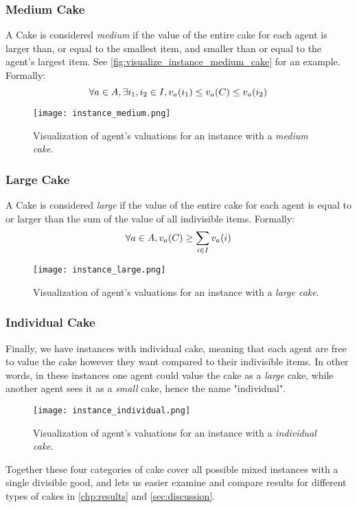 \subsubsection*{Medium Cake}\label{subsubsec:medium-cake}
A Cake is considered \textit{medium} if the value of the entire cake for each agent is larger than, or equal to the smallest item, and smaller than or equal to the agent's largest item. See \autoref{fig:visualize_instance_medium_cake} for an example. Formally:
$$\forall a\in A, \exists i_1,i_2\in I, v_a(i_1)\leq v_a(C)\leq v_a(i_2)$$
\begin{figure}
    \centering
    \texttt{[image: instance\_medium.png]}
    \caption{Visualization of agent's valuations for an instance with a \textit{medium cake}.}
    \label{fig:visualize_instance_medium_cake}
\end{figure}

\subsubsection*{Large Cake}\label{subsubsec:large-cake}
A Cake is considered \textit{large} if the value of the entire cake for each agent is equal to or larger than the sum of the value of all indivisible items. Formally: 
$$\forall a\in A, v_a(C)\geq \sum_{i\in I}v_a(i)$$
\begin{figure}
    \centering
    \texttt{[image: instance\_large.png]}
    \caption{Visualization of agent's valuations for an instance with a \textit{large cake}.}
    \label{fig:visualize_instance_large_cake}
\end{figure}

\subsubsection{Individual Cake}\label{subsubsec:individual-cake}
Finally, we have instances with individual cake, meaning that each agent are free to value the cake however they want compared to their indivisible items. In other words, in these instances one agent could value the cake as a \textit{large} cake, while another agent sees it as a \textit{small} cake, hence the name "individual".
\begin{figure}
    \centering
    \texttt{[image: instance\_individual.png]}
    \caption{Visualization of agent's valuations for an instance with a \textit{individual cake}.}
    \label{fig:visualize_instance_variable_cake}
\end{figure}

Together these four categories of cake cover all possible mixed instances with a single divisible good, and lets us easier examine and compare results for different types of cakes in \autoref{chp:results} and \autoref{sec:discussion}.
